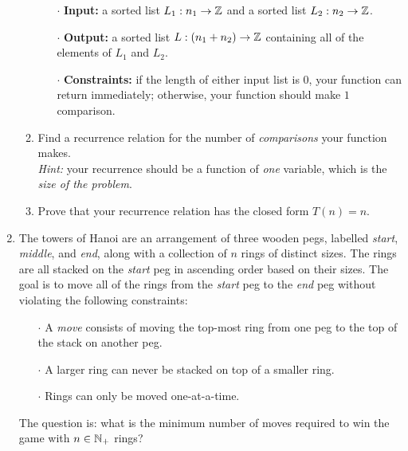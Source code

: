 \begin{enumerate}
\begin{enumerate}
\begin{itemize}
                    \item[$\cdot$]
                        \textbf{Input:}
                        a sorted list $L_1: n_1 \to \mathbb{Z}$ and a sorted list $L_2: n_2 \to \mathbb{Z}$.
                    \item[$\cdot$]
                        \textbf{Output:}
                        a sorted list $L: (n_1 + n_2) \to \mathbb{Z}$ containing all of the elements of $L_1$ and $L_2$.
                    \item[$\cdot$]
                        \textbf{Constraints:}
                        if the length of either input list is $0$, your function can return immediately;
                        otherwise, your function should make $1$ comparison.
                \end{itemize}
            \item
                Find a recurrence relation for the number of \emph{comparisons} your function makes.\\
                \emph{Hint:} your recurrence should be a function of \emph{one} variable,
                which is the \emph{size of the problem}.
            \item
                Prove that your recurrence relation has the closed form $T(n) = n$.
        \end{enumerate}
    \item
        The towers of Hanoi are an arrangement of three wooden pegs,
        labelled \emph{start}, \emph{middle}, and \emph{end},
        along with a collection of $n$ rings of distinct sizes.
        The rings are all stacked on the \emph{start} peg in ascending order based on their sizes.
        The goal is to move all of the rings from the \emph{start} peg to the \emph{end} peg
        without violating the following constraints:
        \begin{itemize}
            \item[$\cdot$]
                A \emph{move} consists of moving the top-most ring from one peg
                to the top of the stack on another peg.
            \item[$\cdot$]
                A larger ring can never be stacked on top of a smaller ring.
            \item[$\cdot$]
                Rings can only be moved one-at-a-time.
        \end{itemize}
        The question is: what is the minimum number of moves required to win the game with $n \in \mathbb{N}_+$ rings?
        \begin{figure}[H]

\end{figure}
\end{enumerate}
